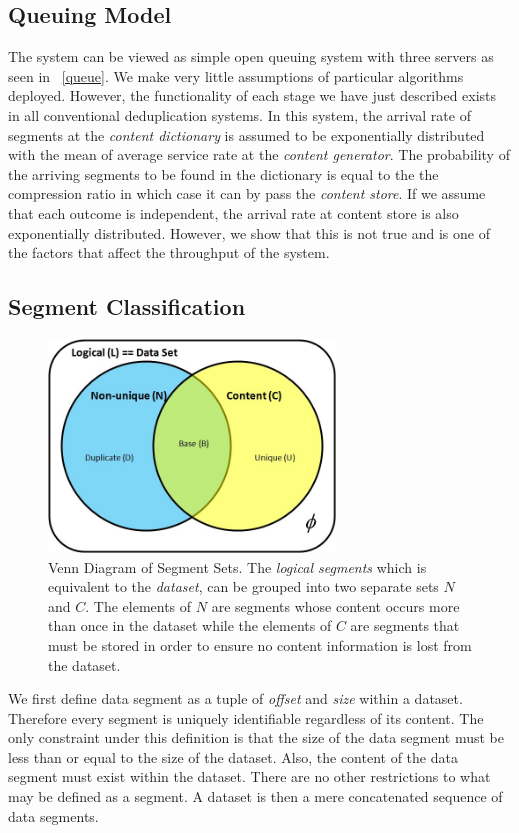 \subsection{Queuing Model}
The system can be viewed as simple open queuing system with three servers as seen in \figurename~\ref{queue}. We make very little assumptions of particular algorithms deployed. However, the functionality of each stage we have just described exists in all conventional deduplication systems. 
In this system, the arrival rate of segments at the \emph{content dictionary} is assumed to be exponentially distributed with the mean of average service rate at the \emph{content generator}. The probability of the arriving segments to be found in the dictionary is equal to the the compression ratio in which case it can by pass the \emph{content store}. If we assume that each outcome is independent, the arrival rate at content store is also exponentially distributed. However, we show that this is not true and is one of the factors that affect the throughput of the system.  

\subsection{Segment Classification}

\begin{figure}[!t]
\centering
\includegraphics[width=3in]{figure/dedup/seg_classification.jpg}
\caption{Venn Diagram of Segment Sets. The \emph{logical segments} which is equivalent to the \emph{dataset}, can be grouped into two separate sets $N$ and $C$. The elements of $N$ are segments whose content occurs more than once in the dataset while the elements of $C$ are segments that must be stored in order to ensure no content information is lost from the dataset.}
\label{seg_class}
\end{figure}

We first define data segment as a tuple of \emph{offset} and \emph{size} within a dataset. Therefore every segment is uniquely identifiable regardless of its content. The only constraint under this definition is that the size of the data segment must be less than or equal to the size of the dataset. Also, the content of the data segment must exist within the dataset. There are no other restrictions to what may be defined as a segment. A dataset is then a mere concatenated sequence of data segments.

